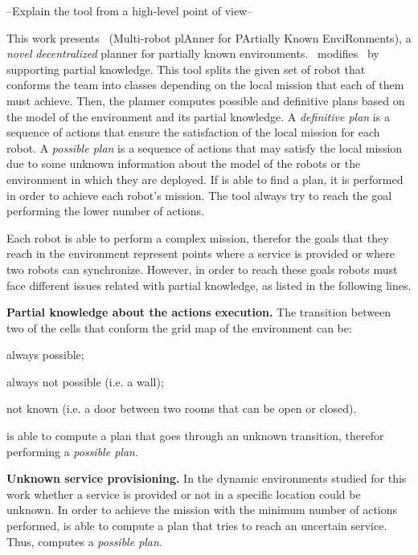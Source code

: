 --Explain the tool from a high-level point of view--

This work presents  \toolName\ (Multi-robot plAnner for PArtially Known EnviRonments), a \emph{novel} \emph{decentralized} planner for partially known environments.
\toolName\ modifies~\cite{tumova2016multi} by supporting partial knowledge.
This tool splits the given set of robot that conforms the team into classes depending on the local mission that each of them must achieve.
Then, the planner computes possible and definitive plans based on the model of the environment and its partial knowledge.
A \emph{definitive plan} is a sequence of actions that ensure the satisfaction of the local mission for each robot. 
A \emph{possible plan} is a sequence of actions that may satisfy the local mission due to some unknown information about the model of the robots or the environment in which they are deployed. 
If \toolName is able to find a plan, it is performed in order to achieve each robot's mission.
The tool always try to reach the goal performing the lower number of actions.

Each robot is able to perform a complex mission, therefor the goals that they reach in the environment represent points where a service is provided  or where two robots can synchronize.
However, in order to reach these goals robots must face different issues related with partial knowledge, as listed in the following lines.

\textbf{Partial knowledge about the actions execution.} 
The transition between two of the cells that conform the grid map of the environment can be:
\begin{enumerate*}
\item always possible;
\item always not possible (i.e. a wall);
\item not known (i.e. a door between two rooms that can be open or closed).
\end{enumerate*}
\toolName is able to compute a plan that goes through an unknown transition, therefor performing a \emph{possible plan}.

\textbf{Unknown service provisioning.} 
In the dynamic environments studied for this work whether a service is provided or not in a specific location could be unknown. 
In order to achieve the mission with the minimum number of actions performed, \toolName is able to compute a plan that tries to reach an uncertain service.
Thus, \toolName computes a \emph{possible plan}.

